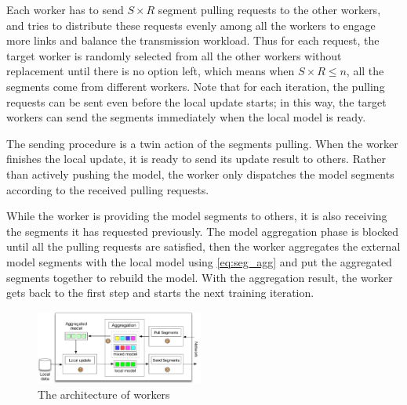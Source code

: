 Each worker has to send $S\times R$ segment pulling requests to the other workers, and \sys tries to distribute these requests evenly among all the workers to engage more links and balance the transmission workload. Thus for each request, the target worker is randomly selected from all the other workers without replacement until there is no option left, which means when $S\times R \leq n$, all the segments come from different workers. Note that for each iteration, the pulling requests can be sent even before the local update starts; in this way, the target workers can send the segments immediately when the local model is ready.

 The sending procedure is a twin action of the segments pulling. When the worker finishes the local update, it is ready to send its update result to others. Rather than actively pushing the model, the worker only dispatches the model segments according to the received pulling requests.

 While the worker is providing the model segments to others, it is also receiving the segments it has requested previously. The model aggregation phase is blocked until all the pulling requests are satisfied, then the worker aggregates the external model segments with the local model using \eqref{eq:seg_agg} and put the aggregated segments together to rebuild the model. With the aggregation result, the worker gets back to the first step and starts the next training iteration.


\begin{figure}[H]
\centering 
\includegraphics[width=0.49\textwidth]{pics/worker_arch.pdf}
\caption{The architecture of \sys workers}
\label{Fig: worker-arch}
\end{figure}












